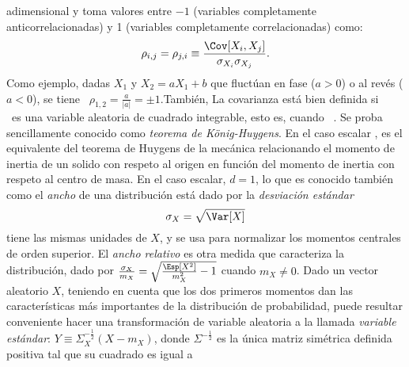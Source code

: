 \begin{itemize}
\begin{enumerate}
  adimensional   y   toma    valores   entre   $-1$   (variables   completamente
  anticorrelacionadas) y 1 (variables completamente correlacionadas) como:
  \[
  \rho_{i,j} = \rho_{j,i} \equiv \frac{\Cov[X_i,X_j]}{\sigma_{X_i} \sigma_{X_j}}.
  \]
  Como ejemplo, dadas $X_1$ y $X_2 = a X_1 + b$ que fluct\'uan en fase ($a>0$) o
  al rev\'es ($a<0$), se tiene   \ $\rho_{1,2}  = \frac{a}{|a|}  = \pm
  1$.\newline Tambi\'en,  
  La covarianza  est\'a bien definida si \   \  es una variable
  aleatoria de cuadrado integrable, esto  es, cuando \ .   Se  proba   sencillamente   conocido como  {\it teorema de K\"onig-Huygens}.  En  el caso escalar ,  es  el  equivalente  del teorema  de  Huygens  de  la  mec\'anica
relacionando  el momento  de  inertia de  un  solido con  respeto  al origen  en
funci\'on  del momento  de  inertia con  respeto  al centro  de masa.  
  En el caso escalar, $d = 1$,  lo que es conocido tambi\'en como el {\it ancho}
  de una distribuci\'on est\'a dado por la {\it desviaci\'on est\'andar}
  \[
  \sigma_X = \sqrt{\Var[X]}
  \]
  tiene  las mismas  unidades de  $X$,  y se  usa para  normalizar los  momentos
  centrales  de orden  superior.  El  {\it ancho  relativo} es  otra  medida que
  caracteriza    la   distribuci\'on,    dado   por    $\frac{\sigma_X}{m_X}   =
  \sqrt{\frac{\Esp\left[  X^2 \right]}{m_X^2}-1}$ cuando  $m_X \ne  0$. \newline
  Dado un vector aleatorio $X$, teniendo en cuenta que los dos primeros momentos
  dan  las   caracter\'isticas  m\'as   importantes  de  la   distribuci\'on  de
  probabilidad,  puede  resultar   conveniente  hacer  una  transformaci\'on  de
  variable  aleatoria  a  la   llamada  {\it  variable  est\'andar}:  $Y  \equiv
  \Sigma_X^{-\frac12} \left(  X - m_X \right)$, donde  $\Sigma^{-\frac12}$ es la
  \'unica matriz  sim\'etrica definida positiva tal  que su cuadrado  es igual a

\end{enumerate}
\end{itemize}
